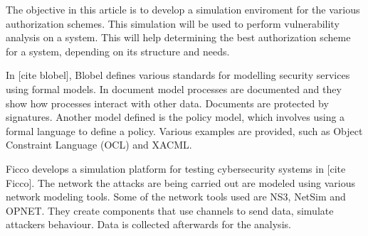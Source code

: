 \documentclass[11pt]{article} %
\begin{document}
The objective in this article is to develop a simulation enviroment for the various authorization schemes. This simulation will be used to perform vulnerability analysis on a system. This will help determining the best authorization scheme for a system, depending on its structure and needs.

In [cite blobel], Blobel defines various standards for modelling security services using formal models. In document model processes are documented and they show how processes interact with other data. Documents are protected by signatures. Another model defined is the policy model, which involves using a formal language to define a policy. Various examples are provided, such as Object Constraint Language (OCL) and XACML.

Ficco develops a simulation platform for testing cybersecurity systems in [cite Ficco]. The network the attacks are being carried out are modeled using various network modeling tools. Some of the network tools used are NS3, NetSim and OPNET. They create components that use channels to send data, simulate attackers behaviour. Data is collected afterwards for the analysis.
\end{document}
